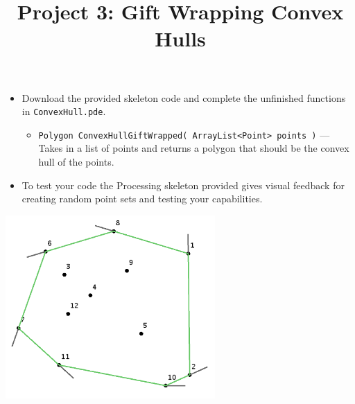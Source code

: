 \documentclass[a4paper,12pt]{article}
\title{Project 3: Gift Wrapping Convex Hulls}
\begin{document}
\maketitle

\projectGroundRules

\projectSubmission

\assignmentInstructions



\begin{itemize}

\item Download the provided skeleton code and complete the unfinished functions in \texttt{ConvexHull.pde}.

\begin{itemize}

   \item \texttt{Polygon ConvexHullGiftWrapped( ArrayList<Point> points )} --- Takes in a list of points and returns a polygon that should be the convex hull of the points.
   
\end{itemize}

\item To test your code the Processing skeleton provided gives visual feedback for creating random point sets and testing your capabilities.

\end{itemize}

\begin{center}
\includegraphics[width=8cm]{../images/project3.png}
\end{center}
\end{document}
